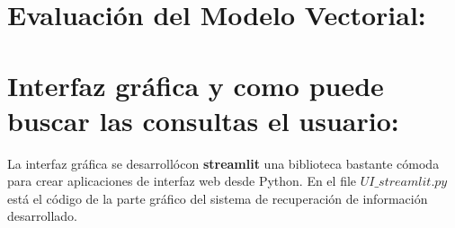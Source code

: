 \documentclass{llncs}
\begin{document}
\section{Evaluación del Modelo Vectorial:}


\section{Interfaz gráfica y como puede buscar las consultas el usuario:}

La interfaz gráfica se desarrollócon \textbf{streamlit} una biblioteca bastante cómoda para 
crear aplicaciones de interfaz web desde Python. En el file $UI\_streamlit.py$ 
está el código de la parte gráfico del sistema de recuperación de información 
desarrollado.
\end{document}
